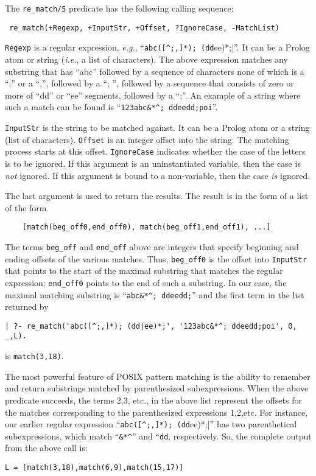 The \verb|re_match/5| predicate has the following calling sequence:
\begin{verbatim}
 re_match(+Regexp, +InputStr, +Offset, ?IgnoreCase, -MatchList)
\end{verbatim}
{\tt Regexp} is a regular expression, {\it e.g.},
``\verb|abc([^;,]*); (dd|ee)*;|''. It can be a Prolog atom or string ({\it i.e.}, a list of
characters). The above expression matches any substring that has ``abc''
followed by a sequence of characters none of which is a ``;'' or a ``,'',
followed by a ``; '', followed by a sequence that consists of zero or more
of ``dd'' or ``ee'' segments, followed by a ``;''. An example of a string
where such a match can be found is ``\verb|123abc&*^; ddeedd;poi|''.

{\tt InputStr} is the string to be matched against. It can be a Prolog atom
or a string (list of characters). {\tt Offset} is an integer offset into
the string. The matching process starts at this offset. {\tt IgnoreCase}
indicates whether the case of the letters is to be ignored. If this
argument is an uninstantiated variable, then the case is \emph{not}
ignored. If this argument is bound to a non-variable, then the case
\emph{is} ignored.

The last argument is used to return the results. The result is in the form
of a list of the form
\begin{verbatim}
    [match(beg_off0,end_off0), match(beg_off1,end_off1), ...]  
\end{verbatim}
The terms {\tt beg\_off} and {\tt end\_off} above are integers that specify
beginning and ending offsets of the various matches. Thus, {\tt beg\_off0}
is the offset into {\tt InputStr} that points to the start of the maximal
substring that matches the regular expression; {\tt end\_off0} points to the
end of such a substring. In our case, the maximal matching substring is 
``\verb|abc&*^; ddeedd;|'' and the first term in the list returned by
\begin{verbatim}
| ?- re_match('abc([^;,]*); (dd|ee)*;', '123abc&*^; ddeedd;poi', 0, _,L).  
\end{verbatim}
is {\tt match(3,18)}.

The most powerful feature of POSIX pattern matching is the ability to
remember and return substrings matched by parenthesized subexpressions.
When the above predicate succeeds, the terms 2,3, etc., in the above list
represent the offsets for the matches corresponding to the parenthesized
expressions 1,2,etc.
For instance, our earlier regular expression 
  ``\verb|abc([^;,]*); (dd|ee)*;|'' has two parenthetical subexpressions, which
match ``\verb|&*^|'' and ``{\tt dd}, respectively. So, the complete output
from the above call is:
\begin{verbatim}
L = [match(3,18),match(6,9),match(15,17)]  
\end{verbatim}


